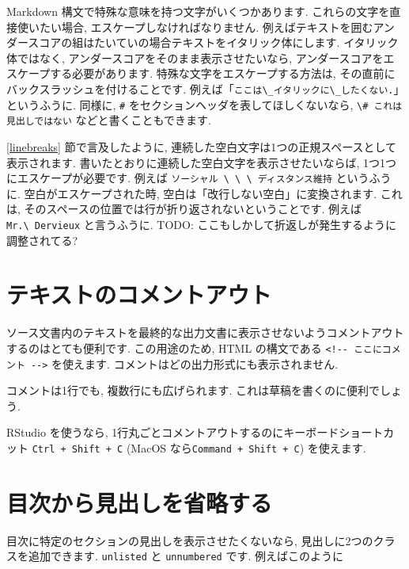 \documentclass[
  11pt,
]{bxjsreport}
\begin{document}
Markdown 構文で特殊な意味を持つ文字がいくつかあります. これらの文字を直接使いたい場合, エスケープしなければなりません. 例えばテキストを囲むアンダースコアの組はたいていの場合テキストをイタリック体にします. イタリック体ではなく, アンダースコアをそのまま表示させたいなら, アンダースコアをエスケープする必要があります. 特殊な文字をエスケープする方法は, その直前にバックスラッシュを付けることです. 例えば「\texttt{ここは\textbackslash{}\_イタリックに\textbackslash{}\_したくない.}」というふうに. 同様に, \texttt{\#} をセクションヘッダを表してほしくないなら, \texttt{\textbackslash{}\#\ これは見出しではない} などと書くこともできます.

\ref{linebreaks} 節で言及したように, 連続した空白文字は1つの正規スペースとして表示されます. 書いたとおりに連続した空白文字を表示させたいならば, 1つ1つにエスケープが必要です. 例えば \texttt{ソーシャル \textbackslash{}\ \textbackslash{}\ \textbackslash{}\ ディスタンス維持} というふうに. 空白がエスケープされた時, 空白は「改行しない空白」に変換されます. これは, そのスペースの位置では行が折り返されないということです. 例えば \texttt{Mr.\textbackslash{}\ Dervieux} と言うふうに. TODO: ここもしかして折返しが発生するように調整されてる?

\hypertarget{comments}{%
\section{テキストのコメントアウト}\label{comments}}

ソース文書内のテキストを最終的な出力文書に表示させないようコメントアウトするのはとても便利です. この用途のため, HTML の構文である \texttt{\textless{}!-\/-\ ここにコメント\ -\/-\textgreater{}} を使えます. コメントはどの出力形式にも表示されません.

コメントは1行でも, 複数行にも広げられます. これは草稿を書くのに便利でしょう.

RStudio を使うなら, 1行丸ごとコメントアウトするのにキーボードショートカット \texttt{Ctrl + Shift + C} (MacOS なら\texttt{Command + Shift + C}) を使えます.

\hypertarget{toc-unlisted}{%
\section{目次から見出しを省略する}\label{toc-unlisted}}

目次に特定のセクションの見出しを表示させたくないなら, 見出しに2つのクラスを追加できます. \texttt{unlisted} と \texttt{unnumbered} です. 例えばこのように
\end{document}
